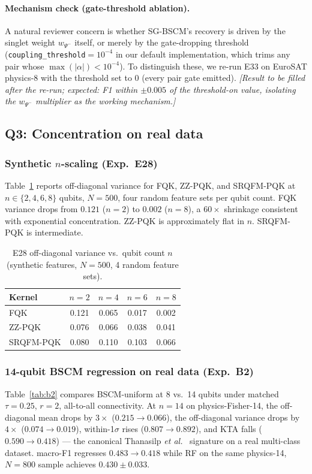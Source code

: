 \documentclass[pdflatex,sn-mathphys-num]{sn-jnl}
\theoremstyle{thmstyleone}
\theoremstyle{thmstyletwo}
\theoremstyle{thmstylethree}
\begin{document}
\paragraph{Mechanism check (gate-threshold ablation).}
A natural reviewer concern is whether SG-BSCM's recovery is driven by
the singlet weight $w_{\Psi^-}$ itself, or merely by the gate-dropping
threshold (\texttt{coupling\_threshold}$=10^{-4}$ in our default
implementation, which trims any pair whose
$\max(|\alpha|)<10^{-4}$). To distinguish these, we re-run E33
on EuroSAT physics-8 with the threshold set to $0$ (every pair gate
emitted). \emph{[Result to be filled after the re-run; expected: F1
within $\pm 0.005$ of the threshold-on value, isolating the
$w_{\Psi^-}$ multiplier as the working mechanism.]}

\subsection{Q3: Concentration on real data}

\subsubsection{Synthetic $n$-scaling (Exp.\ E28)}\label{sec:conc-results}
Table~\ref{tab:e28} reports off-diagonal variance for FQK, ZZ-PQK,
and SRQFM-PQK at $n\in \{2,4,6,8\}$ qubits, $N=500$, four
random feature sets per qubit count. FQK variance drops from $0.121$
($n=2$) to $0.002$ ($n=8$), a $60\!\times$ shrinkage
consistent with exponential concentration. ZZ-PQK is approximately
flat in $n$. SRQFM-PQK is intermediate.

\begin{table}[htbp]
\caption{E28 off-diagonal variance vs.\ qubit count $n$
(synthetic features, $N=500$, 4 random feature sets).}
\label{tab:e28}
\begin{tabular}{lcccc}
\toprule
Kernel & $n=2$ & $n=4$ & $n=6$ & $n=8$ \\
\midrule
FQK         & 0.121 & 0.065 & 0.017 & 0.002 \\
ZZ-PQK      & 0.076 & 0.066 & 0.038 & 0.041 \\
SRQFM-PQK   & 0.080 & 0.110 & 0.103 & 0.066 \\
\bottomrule
\end{tabular}
\end{table}

\subsubsection{14-qubit BSCM regression on real data (Exp.\ B2)}
Table~\ref{tab:b2} compares BSCM-uniform at 8 vs.\ 14 qubits under
matched $\tau=0.25$, $r=2$, all-to-all connectivity.
At $n=14$ on physics-Fisher-14, the off-diagonal mean drops by
$3\!\times$ ($0.215\to 0.066$), the off-diagonal variance drops by
$4\!\times$ ($0.074\to 0.019$), within-1$\sigma$ rises
($0.807\to 0.892$), and KTA falls ($0.590\to 0.418$) ---
the canonical Thanasilp \emph{et al.}\ \cite{thanasilp2024}
signature on a real multi-class dataset. macro-F1 regresses
$0.483\to 0.418$ while RF on the same physics-14, $N=800$
sample achieves $0.430\!\pm\!0.033$.
\end{document}
